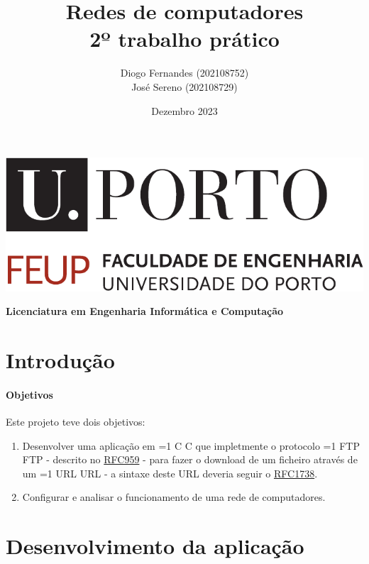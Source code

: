 \documentclass[11pt,a4paper,twocolumn]{article}
\title{%
  Redes de computadores \\
  \large 2º trabalho prático}
\author{%
        Diogo Fernandes (202108752) \\ 
        José Sereno (202108729)}
\date{Dezembro 2023}
\newcommand{\hl}[2][1]{%
  \ifnum#1=1\relax
    \textcolor{text-hl1}{#2}%
  \else
    \textcolor{text-hl2}{#2}%
  \fi
}
\def\course{Licenciatura em Engenharia Informática e Computação}
\begin{document}
\begin{titlepage}
    \begin{center}
        \includegraphics[width=0.8\linewidth]{images/uporto-feup.pdf} 
        \vspace{1cm}

        \LARGE
        \textbf{\thetitle}
        \vfill

        \large
        \textbf{\course}
        \vspace{0.5cm}

        \large
        \textbf{\theauthor}
        \vspace{0.5cm}

        \large
        \thedate
    \end{center}
\end{titlepage}

\tableofcontents

\section{Introdução}

\paragraph{Objetivos}
Este projeto teve dois objetivos:
\begin{enumerate}
    \item Desenvolver uma aplicação em \hl{C} que impletmente o protocolo \hl{FTP} - descrito no \href{https://datatracker.ietf.org/doc/html/rfc959}{RFC959} - para fazer o download de um ficheiro através de um \hl{URL} - a sintaxe deste URL deveria seguir o \href{https://datatracker.ietf.org/doc/html/rfc1738}{RFC1738}.
    \item Configurar e analisar o funcionamento de uma rede de computadores.
\end{enumerate}


\section{Desenvolvimento da aplicação}
\end{document}
